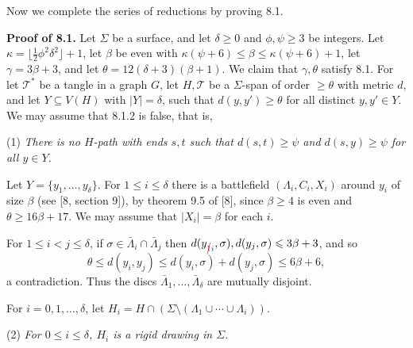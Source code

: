 
Now we complete the series of reductions by proving 8.1.

\textbf{Proof of 8.1.} Let $\Sigma$ be a surface, and let $\delta \ge 0$ and $\phi, \psi \ge 3$ be integers. Let $\kappa = \lfloor \frac{1}{2}\phi^2\delta^2 \rfloor + 1$, let $\beta$ be even with $\kappa(\psi + 6) \le \beta \le \kappa(\psi + 6) + 1$, let $\gamma = 3\beta + 3$, and let $\theta = 12(\delta + 3)(\beta + 1)$. We claim that $\gamma, \theta$ satisfy 8.1. For let $\mathscr{T}^*$ be a tangle in a graph $G$, let $H, \mathscr{T}$ be a $\Sigma$-span of order $\ge \theta$ with metric $d$, and let $Y \subseteq V(H)$ with $|Y| = \delta$, such that $d(y, y') \ge \theta$ for all distinct $y, y' \in Y$. We may assume that 8.1.2 is false, that is,

\hspace*{12pt}(1) \textit{There is no $H$-path with ends $s, t$ such that $d(s, t) \ge \psi$ and $d(s, y) \ge \psi$ for all $y \in Y$.}

Let $Y = \{y_1, \ldots, y_\delta\}$. For $1 \le i \le \delta$ there is a battlefield $(\Lambda_i, C_i, X_i)$ around $y_i$ of size $\beta$ (see [8, section 9]), by theorem 9.5 of [8], since $\beta \ge 4$ is even and $\theta \ge 16\beta + 17$. We may assume that $|X_i| = \beta$ for each $i$.

For $1 \le i < j \le \delta$, if $\sigma \in \bar{\Lambda}_i \cap \bar{\Lambda}_j$ then $d(y_{\delm{1}\fix{i}}, \sigma), d(y_j, \sigma) \le 3\beta + 3$, and so
\begin{equation*}
\theta \le d(y_i, y_j) \le d(y_i, \sigma) + d(y_j, \sigma) \le 6\beta + 6,
\end{equation*}
a contradiction. Thus the discs $\bar{\Lambda}_1, \ldots, \bar{\Lambda}_\delta$ are mutually disjoint.

For $i = 0, 1, \ldots, \delta$, let $H_i = H \cap (\Sigma \setminus (\Lambda_1 \cup \cdots \cup \Lambda_i))$.

\hspace*{12pt}(2) \textit{For $0 \le i \le \delta$, $H_i$ is a rigid drawing in $\Sigma$.}

